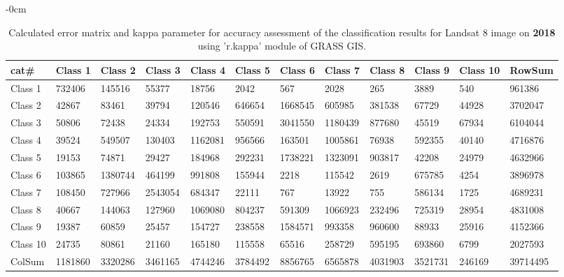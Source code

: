 \documentclass[sustainability,article,submit,pdftex,moreauthors]{Definitions/mdpi}
\begin{document}
\begin{table}[H] 
\footnotesize
    \centering
    \begin{adjustwidth}{-\extralength}{0cm}
    \caption{Calculated error matrix and kappa parameter for accuracy assessment of the classification results for Landsat 8 image on \textbf{2018} using 'r.kappa' module of GRASS GIS.\label{tab03}}
 	\begin{tabularx}{\fulllength}{|l|l|l|l|l|l|l|l|l|l|l|l|}
    \toprule
         cat\# & \textbf{Class 1} & \textbf{Class 2} & \textbf{Class 3} & \textbf{Class 4} & \textbf{Class 5} & \textbf{Class 6} & \textbf{Class 7} & \textbf{Class 8} & \textbf{Class 9} & \textbf{Class 10} & \textbf{RowSum} \\ \hline
        Class 1 & \cellcolor{green!20}732406 & 145516 & 55377 & 18756 & 2042 & 567 & 2028 & 265 & 3889 & 540 & 961386 \\ \hline
        Class 2 & 42867 & \cellcolor{green!20}83461 & 39794 & 120546 & 646654 & 1668545 & 605985 & 381538 & 67729 & 44928 & 3702047 \\ \hline
        Class 3 & 50806 & 72438 & \cellcolor{green!20}24334 & 192753 & 550591 & 3041550 & 1180439 & 877680 & 45519 & 67934 & 6104044 \\ \hline
        Class 4 & 39524 & 549507 & 130403 & \cellcolor{green!20}1162081 & 956566 & 163501 & 1005861 & 76938 & 592355 & 40140 & 4716876 \\ \hline
        Class 5 & 19153 & 74871 & 29427 & 184968 & \cellcolor{green!20}292231 & 1738221 & 1323091 & 903817 & 42208 & 24979 & 4632966 \\ \hline
        Class 6 & 103865 & 1380744 & 464199 & 991808 & 155944 & \cellcolor{green!20}2218 & 115542 & 2619 & 675785 & 4254 & 3896978 \\ \hline
        Class 7 & 108450 & 727966 & 2543054 & 684347 & 22111 & 767 & \cellcolor{green!20}13922 & 755 & 586134 & 1725 & 4689231 \\ \hline
        Class 8 & 40667 & 144063 & 127960 & 1069080 & 804237 & 591309 & 1066923 & \cellcolor{green!20}232496 & 725319 & 28954 & 4831008 \\ \hline
        Class 9 & 19387 & 60859 & 25457 & 154727 & 238558 & 1584571 & 993358 & 960600 & \cellcolor{green!20}88933 & 25916 & 4152366 \\ \hline
        Class 10 & 24735 & 80861 & 21160 & 165180 & 115558 & 65516 & 258729 & 595195 & 693860 & \cellcolor{green!20}6799 & 2027593 \\ \hline
        ColSum & 1181860 & 3320286 & 3461165 & 4744246 & 3784492 & 8856765 & 6565878 & 4031903 & 3521731 & 246169 & \cellcolor{green!20}39714495 \\ \hline
        \bottomrule
    \end{tabularx}
    \end{adjustwidth}
\end{table}
\end{document}
